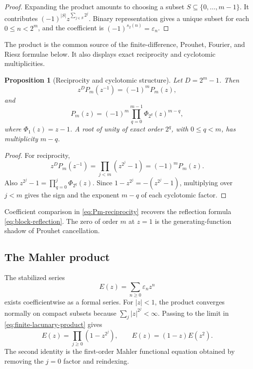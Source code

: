 \documentclass[11pt,oneside]{article}
\newtheorem{proposition}[theorem]{Proposition}
\theoremstyle{definition}
\theoremstyle{remark}
\newcommand{\wt}{s_2}
\newcommand{\eps}{\varepsilon}
\begin{document}
\begin{proof}
Expanding the product amounts to choosing a subset \(S\subseteq\{0,\ldots,m-1\}\).  It
contributes
\((-1)^{|S|}z^{\sum_{j\in S}2^j}\).  Binary representation gives a unique subset for each
\(0\le n<2^m\), and the coefficient is \((-1)^{\wt(n)}=\eps_n\).
\end{proof}

The product is the common source of the finite-difference, Prouhet, Fourier, and Riesz
formulae below.  It also displays exact reciprocity and cyclotomic multiplicities.

\begin{proposition}[Reciprocity and cyclotomic structure]
\label{prop:Pm-cyclotomic}
Let \(D=2^m-1\).  Then
\begin{equation}
  z^DP_m(z^{-1})=(-1)^mP_m(z),                              \label{eq:Pm-reciprocity}
\end{equation}
and
\begin{equation}
  \boxed{
  P_m(z)=(-1)^m\prod_{q=0}^{m-1}\Phi_{2^q}(z)^{m-q},}      \label{eq:Pm-cyclotomic}
\end{equation}
where \(\Phi_1(z)=z-1\).  A root of unity of exact order \(2^q\), with
\(0\le q<m\), has multiplicity \(m-q\).
\end{proposition}

\begin{proof}
For reciprocity,
\[
  z^DP_m(z^{-1})=\prod_{j<m}(z^{2^j}-1)=(-1)^mP_m(z).
\]
Also \(z^{2^j}-1=\prod_{q=0}^{j}\Phi_{2^q}(z)\).  Since
\(1-z^{2^j}=-(z^{2^j}-1)\), multiplying over \(j<m\) gives the sign and the exponent
\(m-q\) of each cyclotomic factor.
\end{proof}

Coefficient comparison in \eqref{eq:Pm-reciprocity} recovers the reflection formula
\eqref{eq:block-reflection}.  The zero of order \(m\) at \(z=1\) is the generating-function
shadow of Prouhet cancellation.

\subsection{The Mahler product}

The stabilized series
\begin{equation}
  E(z)=\sum_{n\ge0}\eps_nz^n                              \label{eq:E-definition}
\end{equation}
exists coefficientwise as a formal series.  For \(|z|<1\), the product converges normally
on compact subsets because \(\sum_j|z|^{2^j}<\infty\).  Passing to the limit in
\eqref{eq:finite-lacunary-product} gives
\begin{equation}
  \boxed{
  E(z)=\prod_{j\ge0}(1-z^{2^j}),
  \qquad
  E(z)=(1-z)E(z^2).}                                       \label{eq:E-Mahler}
\end{equation}
The second identity is the first-order Mahler functional equation obtained by removing the
\(j=0\) factor and reindexing.
\end{document}
